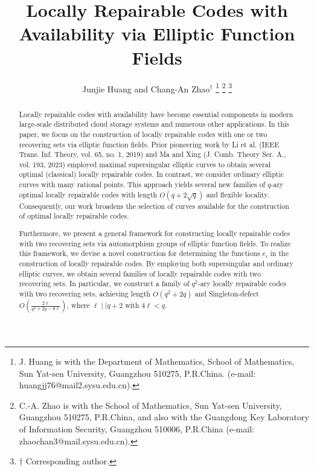 \documentclass[journal,12pt,onecolumn]{IEEEtran}
\begin{document}
\title{Locally Repairable Codes with Availability via Elliptic Function Fields}
\author{Junjie Huang and Chang-An Zhao$^\dagger$
\thanks{J. Huang is with the Department of Mathematics, School of Mathematics, Sun Yat-sen University, Guangzhou 510275, P.R.China. (e-mail: huangjj76@mail2.sysu.edu.cn).}
\thanks{C.-A. Zhao is with the School of Mathematics, Sun Yat-sen University, Guangzhou 510275, P.R.China, and also with the Guangdong Key Laboratory of Information Security, Guangzhou 510006, P.R.China (e-mail: zhaochan3@mail.sysu.edu.cn).}
\thanks{\(\dagger\) Corresponding author. }
}


\maketitle


\begin{abstract}
Locally repairable codes with availability have become essential components in modern large-scale distributed cloud storage systems and numerous other applications. In this paper, we focus on the construction of locally repairable codes with one or two recovering sets via elliptic function fields. Prior pioneering work by Li et al. (IEEE Trans. Inf. Theory, vol. 65, no. 1, 2019) and Ma and Xing (J. Comb. Theory Ser. A., vol. 193, 2023) employed maximal supersingular elliptic curves to obtain several optimal (classical) locally repairable codes. In contrast, we consider ordinary elliptic curves with many rational points. This approach yields several new families  of \(q\)-ary optimal locally repairable codes with length \(O(q+2\sqrt{q})\) and flexible locality. Consequently, our work broadens the selection of curves available for the construction of optimal locally repairable codes.

Furthermore, we present a general framework for constructing locally repairable codes with two recovering sets via automorphism groups of elliptic function fields. To realize this framework, we devise a novel construction for determining the functions \(e_i\) in the construction of locally repairable codes. By employing both supersingular and ordinary elliptic curves, we obtain several families of locally repairable codes with two recovering sets.  In particular, we construct a family of \(q^2\)-ary locally repairable codes with two recovering sets, achieving length \(O(q^2+2q)\) and Singleton-defect \(O\!\left(\frac{2\ell}{q^2+2q-8\ell}\right)\), where \(\ell \mid\mid q + 2\) with \(4\ell < q\).
\end{abstract}
\end{document}
